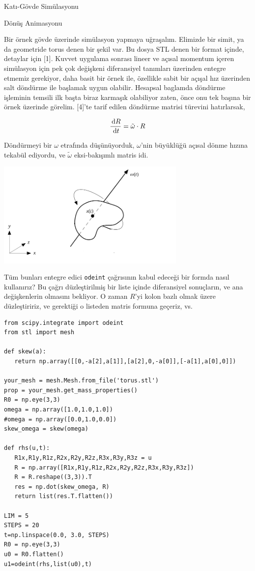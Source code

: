 \documentclass[12pt,fleqn]{article}\usepackage{../../common}
\begin{document}
Katı-Gövde Simülasyonu

Dönüş Animasyonu

Bir örnek gövde üzerinde simülasyon yapmaya uğraşalım. Elimizde bir simit, ya da
geometride torus denen bir şekil var. Bu dosya STL denen bir format içinde,
detaylar için [1]. Kuvvet uygulama sonrası lineer ve açısal momentum içeren
simülasyon için pek çok değişkeni diferansiyel tanımları üzerinden entegre
etmemiz gerekiyor, daha basit bir örnek ile, özellikle sabit bir açışal hız
üzerinden salt döndürme ile başlamak uygun olabilir. Hesapsal baglamda döndürme
işleminin temsili ilk başta biraz karmaşık olabiliyor zaten, önce onu tek başına
bir örnek üzerinde görelim. [4]'te tarif edilen döndürme matrisi türevini
hatırlarsak,

$$
\frac{\,\mathrm{d} R}{\,\mathrm{d} t} = \tilde \omega \cdot R
$$

Döndürmeyi bir $\omega$ etrafında düşünüyorduk, $\omega$'nin büyüklüğü
açısal dönme hızına tekabül ediyordu, ve $\tilde \omega$ eksi-bakışımlı
matris idi.

\includegraphics[width=25em]{phy_005_basics_04_01.png}

Tüm bunları entegre edici \verb!odeint! çağrısının kabul edeceği bir formda
nasıl kullanırız? Bu çağrı düzleştirilmiş bir liste içinde diferansiyel
sonuçların, ve ana değişkenlerin olmasını bekliyor. O zaman $R$'yi kolon bazlı
olmak üzere düzleştiririz, ve gerektiği o listeden matris formuna geçeriz, vs.

\begin{verbatim}
from scipy.integrate import odeint
from stl import mesh

def skew(a):
   return np.array([[0,-a[2],a[1]],[a[2],0,-a[0]],[-a[1],a[0],0]])

your_mesh = mesh.Mesh.from_file('torus.stl')
prop = your_mesh.get_mass_properties()
R0 = np.eye(3,3)
omega = np.array([1.0,1.0,1.0])
#omega = np.array([0.0,1.0,0.0])
skew_omega = skew(omega)
   
def rhs(u,t):   
   R1x,R1y,R1z,R2x,R2y,R2z,R3x,R3y,R3z = u
   R = np.array([R1x,R1y,R1z,R2x,R2y,R2z,R3x,R3y,R3z])
   R = R.reshape((3,3)).T
   res = np.dot(skew_omega, R)
   return list(res.T.flatten())

LIM = 5
STEPS = 20
t=np.linspace(0.0, 3.0, STEPS)
R0 = np.eye(3,3)
u0 = R0.flatten()
u1=odeint(rhs,list(u0),t)
\end{verbatim}
\end{document}
